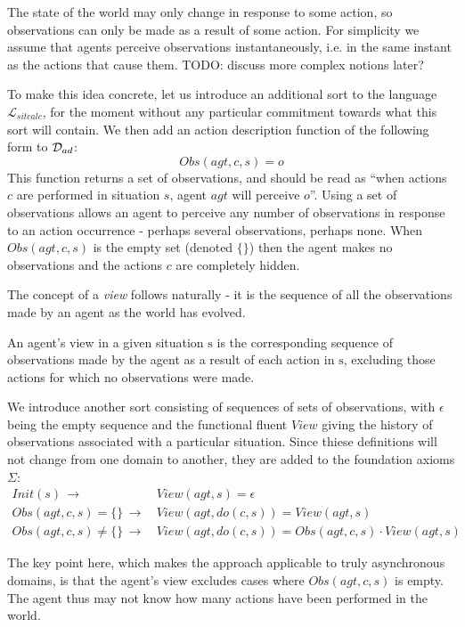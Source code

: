 The state of the world may only change in response to some action,
so observations can only be made as a result of some action. For simplicity
we assume that agents perceive observations instantaneously, i.e.
in the same instant as the actions that cause them. TODO: discuss
more complex notions later?

To make this idea concrete, let us introduce an additional sort 
to the language $\mathcal{L}_{sitcalc}$, for the moment without any
particular commitment towards what this sort will contain. We then
add an action description function of the following form to $\mathcal{D}_{ad}$:\[
Obs(agt,c,s)=o\]
 This function returns a set of observations, and should be read as
{}``when actions $c$ are performed in situation $s$, agent $agt$
will perceive $o$''. Using a set of observations allows an agent
to perceive any number of observations in response to an action occurrence
- perhaps several observations, perhaps none. When $Obs(agt,c,s)$
is the empty set (denoted $\{\}$) then the agent makes no observations
and the actions $c$ are completely hidden.

The concept of a \emph{view} follows naturally - it is the sequence
of all the observations made by an agent as the world has evolved.

\begin{defnL}
[{Views}] An agent's view in a given situation $\mathrm{s}$
is the corresponding sequence of observations made by the agent as
a result of each action in $\mathrm{s}$, excluding those actions
for which no observations were made. 
\end{defnL}
We introduce another sort  consisting of sequences of
sets of observations, with $\epsilon$ being the empty sequence and
the functional fluent $View$ giving the history of observations associated
with a particular situation. Since thiese definitions will not change
from one domain to another, they are added to the foundation axioms
$\Sigma$:\begin{align}
Init(s)\,\rightarrow & \, View(agt,s)=\epsilon\nonumber \\
Obs(agt,c,s)=\{\}\,\rightarrow & \, View(agt,do(c,s))=View(agt,s)\nonumber \\
Obs(agt,c,s)\neq\{\}\,\rightarrow & \, View(agt,do(c,s))=Obs(agt,c,s)\cdot View(agt,s)\label{eq:view_defn}\end{align}


The key point here, which makes the approach applicable to truly asynchronous
domains, is that the agent's view excludes cases where $Obs(agt,c,s)$
is empty. The agent thus may not know how many actions have been performed
in the world.

